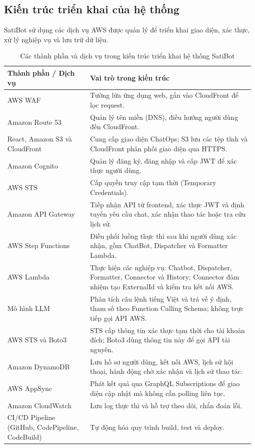 \documentclass[a4paper,12pt]{article}
\newcommand{\bangfont}{\fontsize{12}{15}\selectfont}
\begin{document}
\subsection{Kiến trúc triển khai của hệ thống}

SatiBot sử dụng các dịch vụ AWS được quản lý để triển khai giao diện, xác thực, xử lý nghiệp vụ và lưu trữ dữ liệu.

\begin{table}[H]
\centering
\caption{Các thành phần và dịch vụ trong kiến trúc triển khai hệ thống SatiBot}
\label{tab:kientruc}
\bangfont
\begin{tabularx}{\linewidth}{@{}>{\raggedright\arraybackslash}p{4.5cm}Y@{}}
\toprule
\textbf{Thành phần / Dịch vụ} & \textbf{Vai trò trong kiến trúc}\\
\midrule
AWS WAF & Tường lửa ứng dụng web, gắn vào CloudFront để lọc request. \\
Amazon Route 53 & Quản lý tên miền (DNS), điều hướng người dùng đến CloudFront. \\
React, Amazon S3 và CloudFront & Cung cấp giao diện ChatOps; S3 lưu các tệp tĩnh và CloudFront phân phối giao diện qua HTTPS.\\
Amazon Cognito & Quản lý đăng ký, đăng nhập và cấp JWT để xác thực người dùng.\\
AWS STS & Cấp quyền truy cập tạm thời (Temporary Credentials). \\
Amazon API Gateway & Tiếp nhận API từ frontend, xác thực JWT và định tuyến yêu cầu chat, xác nhận thao tác hoặc tra cứu lịch sử.\\
AWS Step Functions & Điều phối luồng thực thi sau khi người dùng xác nhận, gồm ChatBot, Dispatcher và Formatter Lambda.\\
AWS Lambda & Thực hiện các nghiệp vụ: Chatbot, Dispatcher, Formatter, Connector và History; Connector đảm nhiệm tạo ExternalId và kiểm tra kết nối AWS.\\
Mô hình LLM & Phân tích câu lệnh tiếng Việt và trả về ý định, tham số theo Function Calling Schema; không trực tiếp gọi API AWS.\\
AWS STS và Boto3 & STS cấp thông tin xác thực tạm thời cho tài khoản đích; Boto3 dùng thông tin này để gọi API tài nguyên.\\
Amazon DynamoDB & Lưu hồ sơ người dùng, kết nối AWS, lịch sử hội thoại, hành động chờ xác nhận và lịch sử thao tác.\\
AWS AppSync & Phát kết quả qua GraphQL Subscriptions để giao diện cập nhật mà không cần polling liên tục.\\
Amazon CloudWatch & Lưu log thực thi và hỗ trợ theo dõi, chẩn đoán lỗi.\\
CI/CD Pipeline (GitHub, CodePipeline, CodeBuild) & Tự động hóa quy trình build, test và deploy. \\
\bottomrule
\end{tabularx}
\end{table}
\end{document}
